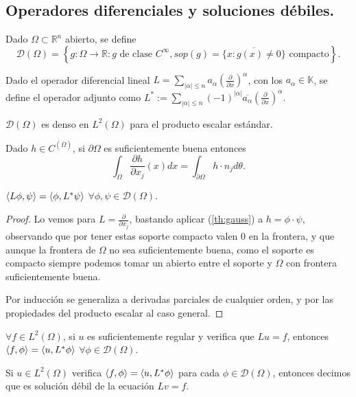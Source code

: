 \subsection{Operadores diferenciales y soluciones débiles.}

\begin{definition}
  Dado $\Omega\subset \mathbb{R}^n$ abierto, se define
  \[
  \mathcal{D}(\Omega)=\left\{g:\Omega\to \mathbb{R}:g\text{ de clase
  }C^\infty,sop(g)=\overline{\{x:g(x)\neq 0\} } \text{ compacto}\right\} 
  .\] 
\end{definition}

\begin{definition}
  Dado el operador diferencial lineal $L=\sum_{|\alpha|\le n}a_\alpha\left(
  \frac{\partial}{\partial x} \right)^\alpha$, con los $a_\alpha\in \mathbb{K}$,
  se define el operador adjunto como $L^*:=\sum_{|\alpha|\le
  n}(-1)^{|\alpha|}\overline{a_\alpha}\left( \frac{\partial}{\partial x}
\right)^\alpha$.
\end{definition}

\begin{lemma}[Regularación]
  $\mathcal{D}(\Omega)$ es denso en $L^2(\Omega)$ para el producto escalar
  estándar.
\end{lemma}

\begin{theorem}[Gauss]\label{th:gauss}
  Dado $h\in C^(\overline{\Omega})$, si $\partial \Omega$ es suficientemente
  buena entonces
  \[
    \int_\Omega \frac{\partial h}{\partial x_j} (x)dx=
    \int_{\partial \Omega} h\cdot n_j d\theta
  .\] 
\end{theorem}

\begin{proposition}
  $\left\langle L\phi,\psi\right\rangle=\left\langle\phi,L^*\psi\right\rangle$ $\forall \phi,\psi \in
  \mathcal{D}(\Omega)$.
\end{proposition}

\begin{proof}
  Lo vemos para $L=\frac{\partial }{\partial x_j} $, bastando aplicar
  (\ref{th:gauss}) a $h=\phi\cdot \psi$, observando que por tener estas soporte
  compacto valen $0$ en la frontera, y que aunque la frontera de $\Omega$ no sea
  suficientemente buena, como el soporte es compacto siempre podemos tomar un
  abierto entre el soporte y $\Omega$ con frontera suficientemente buena.

  Por inducción se generaliza a derivadas parciales de cualquier orden, y por
las propiedades del producto escalar al caso general.
\end{proof}

\begin{corollary}
  $\forall f\in L^2(\Omega)$, si $u$ es suficientemente regular y verifica que
  $Lu=f$, entonces $\left\langle f,\phi\right\rangle=\left\langle u,L^* \phi\right\rangle$ $\forall \phi \in
  \mathcal{D}(\Omega)$.
\end{corollary}

\begin{definition}
  Si $u\in L^2(\Omega)$ verifica $\left\langle f,\phi\right\rangle=\left\langle u,L^* \phi\right\rangle$ para cada
  $\phi \in \mathcal{D}(\Omega)$, entonces decimos que es solución débil de la
  ecuación $Lv=f$.
\end{definition}
